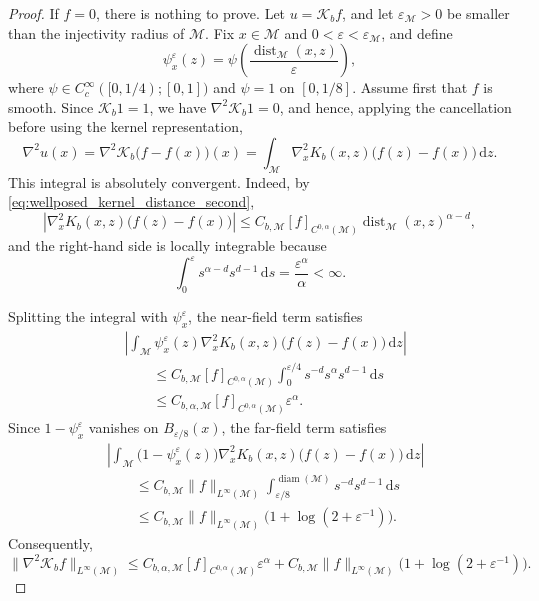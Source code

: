 \documentclass[11pt]{article}
\theoremstyle{definition}
\def\M{\mathcal M}
\def\d{\mathrm{d}}
\begin{document}
\begin{proof}
If \(f=0\), there is nothing to prove. Let \(u=\mathcal K_bf\), and let
\(\varepsilon_{\M}>0\) be smaller than the injectivity radius of \(\M\).
Fix \(x\in\M\) and \(0<\varepsilon<\varepsilon_{\M}\), and define
\[
\psi_x^\varepsilon(z)
=
\psi\!\left(
\frac{\operatorname{dist}_{\M}(x,z)}{\varepsilon}
\right),
\]
where \(\psi\in C_c^\infty([0,1/4);[0,1])\) and
\(\psi=1\) on \([0,1/8]\).
Assume first that \(f\) is smooth. Since \(\mathcal K_b1=1\), we have
\(\nabla^2\mathcal K_b1=0\), and hence, applying the cancellation before
using the kernel representation,
\[
\nabla^2u(x)
=
\nabla^2\mathcal K_b\bigl(f-f(x)\bigr)(x)
=
\int_\M
\nabla_x^2K_b(x,z)\bigl(f(z)-f(x)\bigr)\,\d z.
\]
This integral is absolutely convergent. Indeed, by
\eqref{eq:wellposed_kernel_distance_second},
\[
\left|
\nabla_x^2K_b(x,z)\bigl(f(z)-f(x)\bigr)
\right|
\le
C_{b,\M}[f]_{C^{0,\alpha}(\M)}
\operatorname{dist}_{\M}(x,z)^{\alpha-d},
\]
and the right-hand side is locally integrable because
\[
\int_0^\varepsilon s^{\alpha-d}s^{d-1}\,\d s
=
\frac{\varepsilon^\alpha}{\alpha}<\infty.
\]

Splitting the integral with \(\psi_x^\varepsilon\), the near-field term
satisfies
\[
\begin{aligned}
&\left|
\int_\M
\psi_x^\varepsilon(z)\nabla_x^2K_b(x,z)
\bigl(f(z)-f(x)\bigr)\,\d z
\right|\\
&\qquad\le
C_{b,\M}[f]_{C^{0,\alpha}(\M)}
\int_0^{\varepsilon/4}
s^{-d}s^\alpha s^{d-1}\,\d s\\
&\qquad\le
C_{b,\alpha,\M}
[f]_{C^{0,\alpha}(\M)}\varepsilon^\alpha.
\end{aligned}
\]
Since \(1-\psi_x^\varepsilon\) vanishes on \(B_{\varepsilon/8}(x)\), the
far-field term satisfies
\[
\begin{aligned}
&\left|
\int_\M
\bigl(1-\psi_x^\varepsilon(z)\bigr)
\nabla_x^2K_b(x,z)
\bigl(f(z)-f(x)\bigr)\,\d z
\right|\\
&\qquad\le
C_{b,\M}\|f\|_{L^\infty(\M)}
\int_{\varepsilon/8}^{\operatorname{diam}(\M)}
s^{-d}s^{d-1}\,\d s\\
&\qquad\le
C_{b,\M}\|f\|_{L^\infty(\M)}
\bigl(1+\log(2+\varepsilon^{-1})\bigr).
\end{aligned}
\]
Consequently,
\[
\|\nabla^2\mathcal K_bf\|_{L^\infty(\M)}
\le
C_{b,\alpha,\M}
[f]_{C^{0,\alpha}(\M)}\varepsilon^\alpha
+
C_{b,\M}\|f\|_{L^\infty(\M)}
\bigl(1+\log(2+\varepsilon^{-1})\bigr).
\]


\end{proof}
\end{document}
